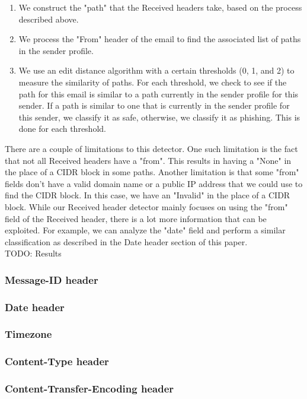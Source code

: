 \documentclass[letterpaper]{article}
\begin{document}
\begin{enumerate}
\item We construct the "path" that the Received headers take, based on the process described above.
\item We process the "From" header of the email to find the associated list of paths in the sender profile.
\item We use an edit distance algorithm with a certain thresholds (0, 1, and 2) to measure the similarity of paths. For each threshold, we check to see if the path for this email is similar to a path currently in the sender profile for this sender. If a path is similar to one that is currently in the sender profile for this sender, we classify it as safe, otherwise, we classify it as phishing. This is done for each threshold. 
\end{enumerate}

There are a couple of limitations to this detector. One such limitation is the fact that not all Received headers have a "from". This results in having a "None" in the place of a CIDR block in some paths. Another limitation is that some "from" fields don't have a valid domain name or a public IP address that we could use to find the CIDR block. In this case, we have an "Invalid" in the place of a CIDR block. While our Received header detector mainly focuses on using the "from" field of the Received header, there is a lot more information that can be exploited. For example, we can analyze the "date" field and perform a similar classification as described in the Date header section of this paper.\\


TODO: Results

\subsubsection{Message-ID header}
\subsubsection{Date header}
\subsubsection{Timezone}
\subsubsection{Content-Type header}
\subsubsection{Content-Transfer-Encoding header}
\end{document}

